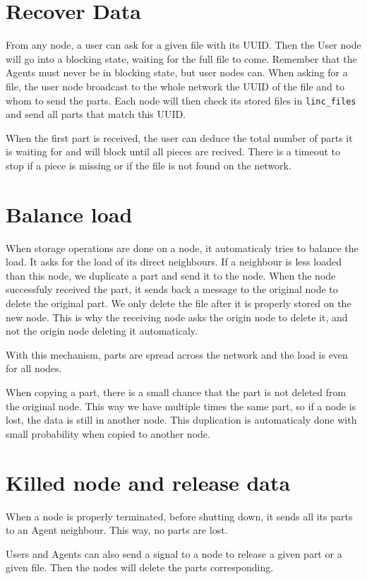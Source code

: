 \documentclass[a4paper,10pt]{report}
\begin{document}
\section{Recover Data}
From any node, a user can ask for a given file with its UUID. Then the
User node will go into a blocking state, waiting for the full file to
come. Remember that the Agents must never be in blocking state, but user
nodes can.
When asking for a file, the user node broadcast to the whole network the
UUID of the file and to whom to send the parts. 
Each node will then check its stored files in \texttt{linc\_files} and
send all parts that match this UUID.

When the first part is received, the user can deduce the total number
of parts it is waiting for and will block until all pieces are recived.
There is a timeout to stop if a piece is missing or if the file is not
found on the network.

\section{Balance load}
When storage operations are done on a node, it automaticaly tries to
balance the load. It asks for the load of its direct neighbours. If 
a neighbour is less loaded than this node, we duplicate a part and send
it to the node. When the node successfuly received the part, it sends
back a message to the original node to delete the original part. We only
delete the file after it is properly stored on the new node. This is 
why the receiving node asks the origin node to delete it, and not the
origin node deleting it automaticaly.

With this mechanism, parts are spread across the network and the
load is even for all nodes.

When copying a part, there is a small chance that the part is not deleted
from the original node. This way we have multiple times the same part,
so if a node is lost, the data is still in another node. This duplication
is automaticaly done with small probability when copied to another node.

\section{Killed node and release data}
When a node is properly terminated, before shutting down, it sends all
its parts to an Agent neighbour. This way, no parts are lost.
 
Users and Agents can also send a signal to a node to release a given 
part or a given file. Then the nodes will delete the parts corresponding.
\end{document}
